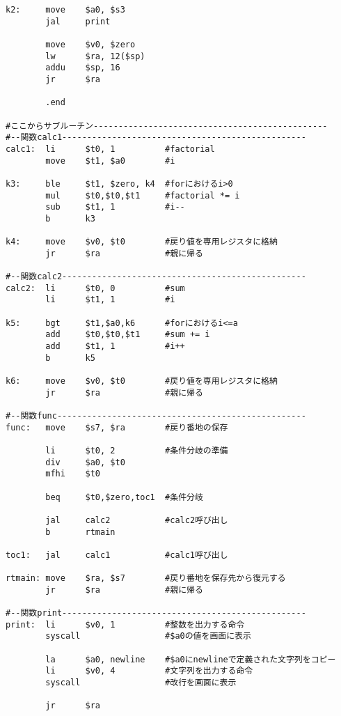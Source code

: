 \documentclass{jsarticle}
\begin{document}
\begin{description}
\begin{description}
\begin{lstlisting}[caption=課題4のソースコード, label=prob4]
k2:     move    $a0, $s3
        jal     print

        move    $v0, $zero
        lw      $ra, 12($sp)
        addu    $sp, 16
        jr      $ra

        .end

#ここからサブルーチン-----------------------------------------------
#--関数calc1-------------------------------------------------
calc1:  li      $t0, 1          #factorial
        move    $t1, $a0        #i

k3:     ble     $t1, $zero, k4  #forにおけるi>0
        mul     $t0,$t0,$t1     #factorial *= i
        sub     $t1, 1          #i--
        b       k3

k4:     move    $v0, $t0        #戻り値を専用レジスタに格納
        jr      $ra             #親に帰る

#--関数calc2-------------------------------------------------
calc2:  li      $t0, 0          #sum
        li      $t1, 1          #i

k5:     bgt     $t1,$a0,k6      #forにおけるi<=a
        add     $t0,$t0,$t1     #sum += i
        add     $t1, 1          #i++
        b       k5

k6:     move    $v0, $t0        #戻り値を専用レジスタに格納
        jr      $ra             #親に帰る

#--関数func--------------------------------------------------
func:   move    $s7, $ra        #戻り番地の保存

        li      $t0, 2          #条件分岐の準備
        div     $a0, $t0
        mfhi    $t0

        beq     $t0,$zero,toc1  #条件分岐

        jal     calc2           #calc2呼び出し
        b       rtmain

toc1:   jal     calc1           #calc1呼び出し

rtmain: move    $ra, $s7        #戻り番地を保存先から復元する
        jr      $ra             #親に帰る

#--関数print-------------------------------------------------
print:  li      $v0, 1          #整数を出力する命令
        syscall                 #$a0の値を画面に表示

        la      $a0, newline    #$a0にnewlineで定義された文字列をコピー
        li      $v0, 4          #文字列を出力する命令
        syscall                 #改行を画面に表示

        jr      $ra
            \end{lstlisting}


\end{description}
\end{description}
\end{document}
